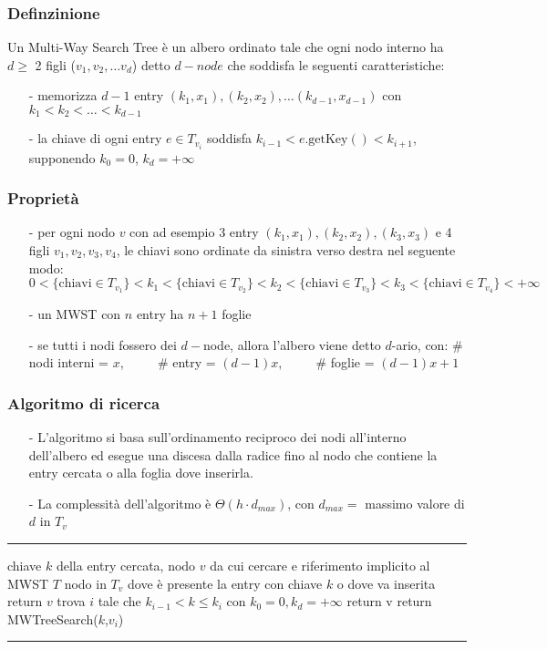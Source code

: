 \documentclass[a4paper]{article}
\makeatletter
\newenvironment{algo}[4]{
	\noindent\rule{\textwidth}{0.4pt}
	\begin{algorithmic}[1]
		\addtocounter{ALG@line}{-1}
		\Procedure{#1}{#2}
		\Require #3
		\Ensure #4
		\Statex }{
		\EndProcedure
	\end{algorithmic}
	\rule{\textwidth}{0.4pt}}
\makeatother
\begin{document}
\subsubsection*{Definzinione}
Un  Multi-Way Search Tree è un albero ordinato tale che ogni nodo interno ha \(d \geq\) 2 figli (\(v_1, v_2, \dots v_d\)) detto
\(d-node\) che soddisfa le seguenti caratteristiche:
\begin{itemize}[topsep=3pt, itemsep=0pt]
	\item[-] memorizza \(d-1\) entry \((k_1,x_1), (k_2,x_2), \dots (k_{d-1}, x_{d-1})\) con \(k_1 < k_2 < \dots < k_{d-1}\)
	\item[-] la chiave di ogni entry \(e \in T_{v_i}\) soddisfa \(k_{i-1} < e.\text{getKey}() < k_{i+1}\), supponendo \(k_0 = 0\), \(k_d = +\infty\)
\end{itemize}

\subsubsection*{Proprietà}
\begin{itemize}[topsep=3pt, itemsep=0pt]
	\item[-] per ogni nodo \(v\) con ad esempio 3 entry \((k_1, x_1), (k_2, x_2), (k_3, x_3)\) e 4 figli \(v_1, v_2, v_3, v_4\),
	le chiavi sono ordinate da sinistra verso destra nel seguente modo:
	\subitem \(0 < \{\text{chiavi} \in T_{v_1}\} < k_1 < \{\text{chiavi} \in T_{v_2}\} < k_2 < \{\text{chiavi} \in T_{v_3}\} < k_3 < \{\text{chiavi} \in T_{v_4}\} < +\infty\)
	\item[-] un MWST con \(n\) entry ha \(n+1\) foglie
	\item[-] se tutti i nodi fossero dei \(d-\)node, allora l'albero viene detto \(d\)-ario, con:
	\subitem \# nodi interni = \(x\), \(\qquad\) \# entry = \((d-1)x\), \(\qquad\) \# foglie = \((d-1)x + 1\)
\end{itemize}

\subsubsection*{Algoritmo di ricerca}
\begin{itemize}[topsep=3pt, itemsep=0pt]
	\item[-] L'algoritmo si basa sull'ordinamento reciproco dei nodi all'interno dell'albero ed esegue una discesa dalla radice
	fino al nodo che contiene la entry cercata o alla foglia dove inserirla.
	\item[-] La complessità dell'algoritmo è \(\Theta(h \cdot d_{max})\), con \(d_{max} = \) massimo valore di \(d\) in \(T_v\)  
\end{itemize}
\begin{algo}{MWTreeSearch}{$k$, $v$}{chiave $k$ della entry cercata, nodo $v$ da cui cercare e riferimento implicito al MWST $T$}{nodo in $T_v$ dove è presente la entry con chiave $k$ o dove va inserita}
		\State return $v$
	\EndIf
	\State trova $i$ tale che $k_{i-1} < k \leq k_i$ con $k_0 = 0, k_d = +\infty$
		\State return v
	\Else
		\State return MWTreeSearch($k$,$v_i$)
	\EndIf
\end{algo}
\end{document}
